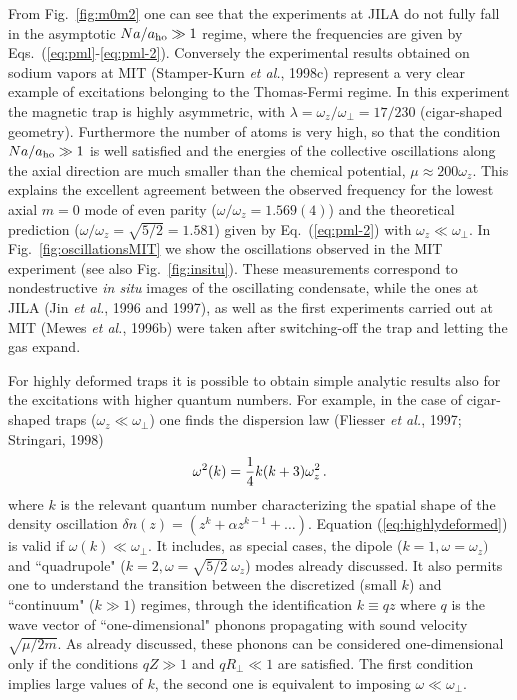  From Fig.~\ref{fig:m0m2} one can see that the  experiments at JILA do 
not fully fall in the asymptotic $Na/a_{\rm ho} \gg 1$ regime, where
the frequencies are given by Eqs.~(\ref{eq:pml}-\ref{eq:pml-2}). Conversely
the experimental results obtained  on sodium vapors at MIT
(Stamper-Kurn {\it et al.}, 1998c) represent a very clear example of
excitations belonging to the Thomas-Fermi regime. 
In this experiment the magnetic trap is highly asymmetric,  with 
$\lambda = \omega_z/ \omega_\perp = 17/230$ (cigar-shaped geometry). 
Furthermore the number of atoms is very high, so that the
condition $Na/a_{\rm ho} \gg 1$ is well satisfied  and the energies of the 
collective oscillations along the axial direction  are much smaller than
the chemical potential, $\mu \approx 200 \omega_z$.  This explains 
the excellent  agreement between the observed  frequency
for  the lowest  axial $m=0$ mode of even parity ($\omega/ \omega_z =
1.569(4)$) and the theoretical prediction ($\omega/\omega_z = \sqrt{5/2}
= 1.581$) given by Eq.~(\ref{eq:pml-2}) with $\omega_z \ll \omega_{\perp}$.  
In Fig.~\ref{fig:oscillationsMIT} we show  the  oscillations observed
in the MIT experiment (see also Fig.~\ref{fig:insitu}). These measurements
correspond  to nondestructive {\it in situ} images of the oscillating 
condensate, while the ones at JILA (Jin {\it et al.}, 1996 and 1997), as  
well as the first experiments  carried out at MIT (Mewes {\it et al.}, 
1996b) were taken after switching-off the trap and letting the gas expand.

For highly deformed traps it is possible to obtain simple analytic
results also for the excitations  with higher quantum numbers. For
example, in the case of cigar-shaped traps ($\omega_z \ll
\omega_{\perp}$) one finds the dispersion law (Fliesser {\it et al.}, 1997; 
Stringari, 1998)
\begin{equation}
\omega^2(k) = {1\over 4}k(k+3)\omega_z^2 \, .
\label{eq:highlydeformed}
\end{equation}
where $k$ is the relevant quantum number characterizing the spatial
shape of the density oscillation $\delta n(z) = (z^k + \alpha
z^{k-1} + \dots)$. Equation (\ref{eq:highlydeformed}) is valid if 
$\omega(k) \ll \omega_{\perp}$.  It includes, as special cases,
the dipole ($k=1, \omega= \omega_z)$ and ``quadrupole" ($k=2, \omega
=\sqrt{5/2}\ \omega_z$) modes already discussed. It also permits one to
understand  the transition between the discretized (small $k$) and
``continuum" ($k\gg 1$) regimes, through the identification
$k\equiv qz$ where $q$ is the wave vector of  ``one-dimensional" phonons
propagating with sound velocity $\sqrt{\mu/2m}$. As already discussed,
these phonons can be considered one-dimensional only if the
conditions $qZ \gg 1$ and  $qR_{\perp}\ll 1$ are satisfied. The
first condition implies large values of $k$, the second one is
equivalent to imposing $\omega \ll \omega_{\perp}$.


